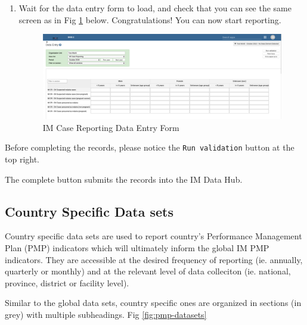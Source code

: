 \documentclass[]{book}
\providecommand{\tightlist}{%
  \setlength{\itemsep}{0pt}\setlength{\parskip}{0pt}}
\begin{document}
\begin{enumerate}
\def\labelenumi{\arabic{enumi}.}
\setcounter{enumi}{4}
\tightlist
\item
  Wait for the data entry form to load, and check that you can see the same screen as in Fig \ref{fig:data-entry} below. Congratulations! You can now start reporting.

  \begin{figure}
  \includegraphics[width=46.42in]{./images/data-entry} \caption{IM Case Reporting Data Entry Form}\label{fig:data-entry}
  \end{figure}
\end{enumerate}

Before completing the records, please notice the \texttt{Run\ validation} button at the top right.

The complete button submits the records into the IM Data Hub.

\hypertarget{country-dataset}{%
\subsection{Country Specific Data sets}\label{country-dataset}}

Country specific data sets are used to report country's Performance Management Plan (PMP) indicators which will ultimately inform the global IM PMP indicators. They are accessible at the desired frequency of reporting (ie. annually, quarterly or monthly) and at the relevant level of data colleciton (ie. national, province, district or facility level).

Similar to the global data sets, country specific ones are organized in sections (in grey) with multiple subheadings. Fig \ref{fig:pmp-datasets}
\end{document}
